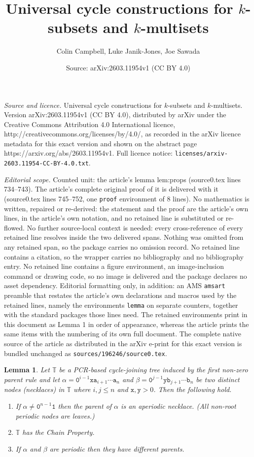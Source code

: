 \documentclass[10pt,a4paper]{amsart}
\title{Universal cycle constructions for $k$-subsets and $k$-multisets}
\author{Colin Campbell, Luke Janik-Jones, Joe Sawada}
\date{Source: arXiv:2603.11954v1 (CC BY 4.0)}
\newtheorem{lemma}{Lemma}
\renewcommand{\tt} {\mathtt}
\begin{document}
\maketitle

\noindent\emph{Source and licence.} Universal cycle constructions for $k$-subsets and $k$-multisets. Version arXiv:2603.11954v1 (CC BY 4.0), distributed by arXiv under the Creative Commons Attribution 4.0 International licence, http://creativecommons.org/licenses/by/4.0/, as recorded in the arXiv licence metadata for this exact version and shown on the abstract page https://arxiv.org/abs/2603.11954v1. Full licence notice: \texttt{licenses/arxiv-2603.11954-CC-BY-4.0.txt}.\par\smallskip

\noindent\textit{Editorial scope.} Counted unit: the article's lemma lem:props (source0.tex lines 734--743). The article's complete original proof of it is delivered with it (source0.tex lines 745--752, one \texttt{proof} environment of 8 lines). No mathematics is written, repaired or re-derived: the statement and the proof are the article's own lines, in the article's own notation, and no retained line is substituted or re-flowed.  No further source-local context is needed: every cross-reference of every retained line resolves inside the two delivered spans.  Nothing was omitted from any retained span, so the package carries no omission record.  No retained line contains a citation, so the wrapper carries no bibliography and no bibliography entry.  No retained line contains a figure environment, an image-inclusion command or drawing code, so no image is delivered and the package declares no asset dependency.  Editorial formatting only, in addition: an AMS \texttt{amsart} preamble that restates the article's own declarations and macros used by the retained lines, namely the environments \texttt{lemma} on separate counters, together with the standard packages those lines need.  The retained environments print in this document as Lemma 1 in order of appearance, whereas the article prints the same items with the numbering of its own full document.  The complete native source of the article as distributed in the arXiv e-print for this exact version is bundled unchanged as \texttt{sources/196246/source0.tex}.
\begin{lemma} \label{lem:props}
Let $\mathbb{T}$ be a PCR-based cycle-joining tree induced by the  first non-zero parent rule and let $\alpha = \tt{0}^{i-1}\tt{x}\tt{a}_{i+1}\cdots \tt{a}_n$ and
$\beta = \tt{0}^{j-1}\tt{y}\tt{b}_{j+1}\cdots \tt{b}_n$ be two distinct nodes (necklaces) in $\mathbb{T}$ where $i,j \leq n$ and $\tt{x},\tt{y} > 0$.  Then the following hold. 
\begin{enumerate}

    \item If $\alpha \neq \tt{0}^{n-1}\tt{1}$ then the parent of $\alpha$ is an aperiodic necklace. (All non-root periodic nodes are leaves.)
        \item $\mathbb{T}$ has the Chain Property.
    \item If $\alpha$ and $\beta$ are periodic then they have different parents.
\end{enumerate}
\end{lemma}
\end{document}
